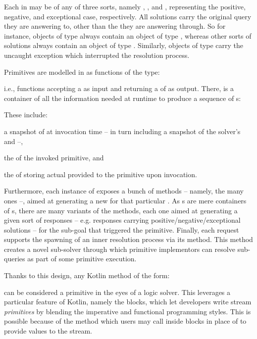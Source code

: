 \documentclass[12pt,a4paper,openright,twoside]{book}
\begin{document}
Each  in \twopkt{} may be of any of three sorts, namely , \mbox{,} and , representing the positive, negative, and exceptional case, respectively.
%
All solutions carry the original query they are answering to, other than the  they are answering through.
%
So for instance, objects of type  always contain an object of type , whereas other sorts of solutions always contain an object of type .
%
Similarly, objects of type  carry the uncaught exception which interrupted the resolution process.

Primitives are modelled in \twopkt{} as functions of the type:
%

%
i.e., functions accepting a  as input and returning a  of  as output.
%
There,  is a container of all the information needed at runtime to produce a sequence of s:
%

%
These include:
%
\begin{inlinelist}
    \item a snapshot of  at invocation time -- in turn including a snapshot of the solver's  and  --,
    \item the  of the invoked primitive, and
    \item the  of  storing actual  provided to the primitive upon invocation.
\end{inlinelist}
%
Furthermore, each instance of  exposes a bunch of methods -- namely, the many  ones --, aimed at generating a new  for that particular .
%
As s are mere containers of s, there are many variants of the  methods, each one aimed at generating a given sort of responses -- e.g. responses carrying positive/negative/exceptional solutions -- for the sub-goal that triggered the primitive.
%
Finally, each request supports the spawning of an inner resolution process via its  method.
%
This method creates a novel sub-solver through which primitive implementors can resolve sub-queries as part of some primitive execution.

Thanks to this design, any Kotlin method of the form:
%

%
can be considered a primitive in the eyes of a logic solver.
%
This leverages a particular feature of Kotlin, namely the  blocks, which let developers write stream \emph{primitives} by blending the imperative and functional programming styles.
%
This is possible because of the  method which users may call inside  blocks in place of  to provide values to the stream.
\end{document}
